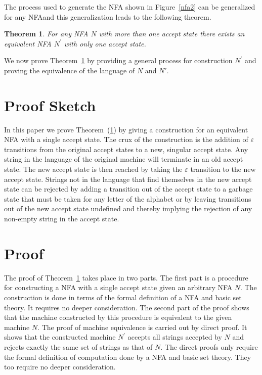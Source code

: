 \documentclass[10pt]{article}
\newtheorem{theorem}{Theorem}
\theoremstyle{definition}
\begin{document}
The process used to generate the NFA shown in Figure~\ref{nfa2} can be generalized for any NFA\@ and this generalization leads to the following theorem.

\begin{theorem}
For any NFA $N$ with more than one accept state there exists an equivalent NFA $N^\prime$ with only one accept state.
\label{th}
\end{theorem}

We now prove Theorem~\ref{th} by providing a general process for construction $N^\prime$ and proving the equivalence of the language of $N$ and $N\prime$.

\section{ Proof Sketch }

In this paper we prove Theorem~(\ref{th}) by giving a construction for an equivalent NFA with a single accept state. The crux of the construction is the addition of $\varepsilon$ transitions from the original accept states to a new, singular accept state. Any string in the language of the original machine will terminate in an old accept state. The new accept state is then reached by taking the $\varepsilon$ transition to the new accept state. Strings not in the language that find themselves in the new accept state can be rejected by adding a transition out of the accept state to a garbage state that must be taken for any letter of the alphabet or by leaving transitions out of the new accept state undefined and thereby implying the rejection of any non-empty string in the accept state.

\section{ Proof }

The proof of Theorem~\ref{th} takes place in two parts. The first part is a procedure for constructing a NFA with a single accept state given an arbitrary NFA $N$\@. The construction is done in terms of the formal definition of a NFA and basic set theory. It requires no deeper consideration. The second part of the proof shows that the machine constructed by this procedure is equivalent to the given machine $N$\@.  The proof of machine equivalence is carried out by direct proof. It shows that the constructed machine $N^\prime$ accepts all strings accepted by $N$ and rejects exactly the same set of strings as that of $N$. The direct proofs only require the formal definition of computation done by a NFA and basic set theory. They too require no deeper consideration.
\end{document}

